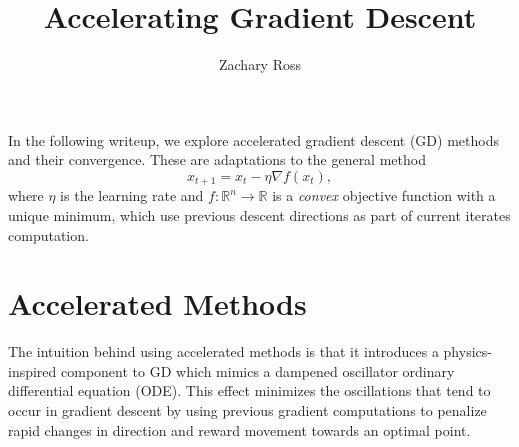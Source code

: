 \documentclass{article}
\title{Accelerating Gradient Descent}
\author{Zachary Ross}
\newcommand{\R}{\mathbb R}
\theoremstyle{definition}
\begin{document}
\maketitle

In the following writeup, we explore accelerated gradient descent (GD) methods
and their convergence. These are adaptations to the general method
\begin{equation}
    \label{eq:gd}
    x_{t + 1} = x_t - \eta \nabla f(x_t),
\end{equation} where $\eta$ is the learning rate and $f: \R^n \rightarrow \R$ is
a \emph{convex} objective function with a unique minimum, which use previous
descent directions as part of current iterates computation. 

\section{Accelerated Methods}

The intuition behind using accelerated methods is that it introduces a
physics-inspired component to GD which mimics a dampened oscillator ordinary
differential equation (ODE). This effect minimizes the oscillations that tend to
occur in gradient descent by using previous gradient computations to penalize
rapid changes in direction and reward movement towards an optimal point.
\end{document}
